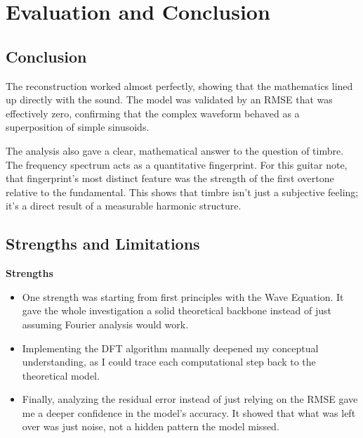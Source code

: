 \documentclass{article}
\begin{document}
\section{Evaluation and Conclusion}

\subsection{Conclusion}
The reconstruction worked almost perfectly, showing that the mathematics lined up directly with the sound. The model was validated by an RMSE that was effectively zero, confirming that the complex waveform behaved as a superposition of simple sinusoids.

The analysis also gave a clear, mathematical answer to the question of timbre. The frequency spectrum acts as a quantitative fingerprint. For this guitar note, that fingerprint's most distinct feature was the strength of the first overtone relative to the fundamental. This shows that timbre isn't just a subjective feeling; it’s a direct result of a measurable harmonic structure.

\subsection{Strengths and Limitations}
\textbf{Strengths}
\begin{itemize}
    \item One strength was starting from first principles with the Wave Equation. It gave the whole investigation a solid theoretical backbone instead of just assuming Fourier analysis would work.
    \item Implementing the DFT algorithm manually deepened my conceptual understanding, as I could trace each computational step back to the theoretical model.
    \item Finally, analyzing the residual error instead of just relying on the RMSE gave me a deeper confidence in the model's accuracy. It showed that what was left over was just noise, not a hidden pattern the model missed.
\end{itemize}
\end{document}
